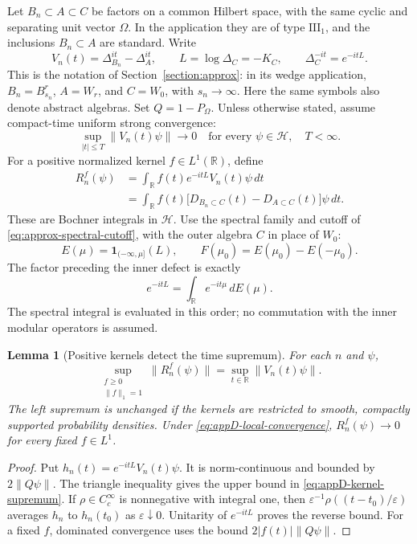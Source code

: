 \documentclass[a4paper,11pt]{article}
\newtheorem{lemma}[theorem]{Lemma}
\theoremstyle{definition}
\begin{document}
Let $B_n\subset A\subset C$ be factors on a common Hilbert space, with the same cyclic and separating unit vector $\Omega$. In the application they are of type $\mathrm{III}_1$, and the inclusions $B_n\subset A$ are standard. Write
\begin{equation}
 V_n(t)=\Delta_{B_n}^{it}-\Delta_A^{it},\qquad
 L=\log\Delta_C=-K_C,\qquad
 \Delta_C^{-it}=e^{-itL}.
 \label{eq:appD-groups}
\end{equation}
This is the notation of Section~\ref{section:approx}: in its wedge application, $B_n=B_{s_n}^r$, $A=W_r$, and $C=W_0$, with $s_n\to\infty$. Here the same symbols also denote abstract algebras. Set $Q=1-P_\Omega$. Unless otherwise stated, assume compact-time uniform strong convergence:
\begin{equation}
 \sup_{|t|\le T}\|V_n(t)\psi\|\longrightarrow0
 \quad\text{for every }\psi\in\mathcal H,\quad T<\infty.
 \label{eq:appD-local-convergence}
\end{equation}
For a positive normalized kernel $f\in L^1(\mathbb R)$, define
\begin{align}
 R_n^f(\psi)
 &=\int_{\mathbb R}f(t)e^{-itL}V_n(t)\psi\,dt \nonumber\\
 &=\int_{\mathbb R}f(t)
 \bigl[D_{B_n\subset C}(t)
       -D_{A\subset C}(t)\bigr]\psi\,dt .
 \label{eq:appD-G}
\end{align}
These are Bochner integrals in $\mathcal H$. Use the spectral family and cutoff of \eqref{eq:approx-spectral-cutoff}, with the outer algebra $C$ in place of $W_0$:
\[
 E(\mu)=\mathbf1_{(-\infty,\mu]}(L),\qquad F(\mu_0)=E(\mu_0)-E(-\mu_0).
\]
The factor preceding the inner defect is exactly
\[
 e^{-itL}=\int_{\mathbb R}e^{-it\mu}\,dE(\mu).
\]
The spectral integral is evaluated in this order; no commutation with the inner modular operators is assumed.

\begin{lemma}[Positive kernels detect the time supremum]
\label{lem:appD-kernel-supremum}
For each $n$ and $\psi$,
\begin{equation}
 \sup_{\substack{f\ge0\\\|f\|_1=1}}\|R_n^f(\psi)\|
 =\sup_{t\in\mathbb R}\|V_n(t)\psi\|.
 \label{eq:appD-kernel-supremum}
\end{equation}
The left supremum is unchanged if the kernels are restricted to smooth, compactly supported probability densities. Under \eqref{eq:appD-local-convergence}, $R_n^f(\psi)\to0$ for every fixed $f\in L^1$.
\end{lemma}
\begin{proof}
Put $h_n(t)=e^{-itL}V_n(t)\psi$. It is norm-continuous and bounded by $2\|Q\psi\|$. The triangle inequality gives the upper bound in \eqref{eq:appD-kernel-supremum}. If $\rho\in C_c^\infty$ is nonnegative with integral one, then
$\varepsilon^{-1}\rho((t-t_0)/\varepsilon)$ averages $h_n$ to $h_n(t_0)$ as $\varepsilon\downarrow0$. Unitarity of $e^{-itL}$ proves the reverse bound. For a fixed $f$, dominated convergence uses the bound $2|f(t)|\|Q\psi\|$.
\end{proof}
\end{document}
